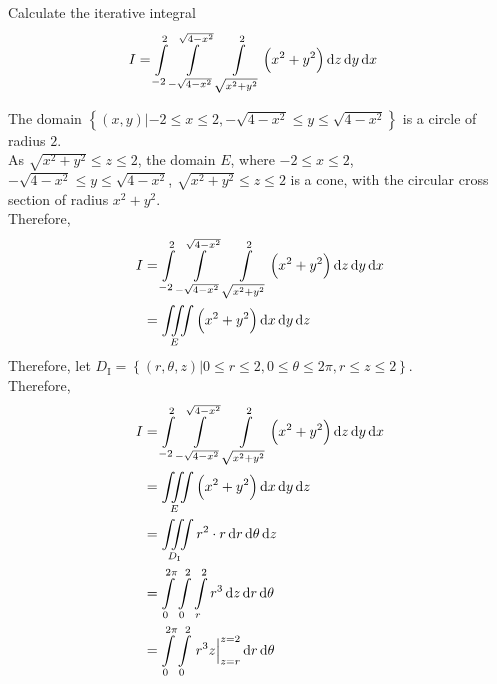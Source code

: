 \documentclass[fleqn, a4paper, 12pt, twoside]{article}
\theoremstyle{definition}
\theoremstyle{theorem}
\begin{document}
{\begin{question}
	Calculate the iterative integral
	\begin{align*}
		I & = \int\limits_{-2}^{2} \int\limits_{-\sqrt{4 - x^2}}^{\sqrt{4 - x^2}} \int\limits_{\sqrt{x^2 + y^2}}^{2} \left( x^2 + y^2 \right) \dif z \dif y \dif x
	\end{align*}
\end{question}

\begin{solution}
	The domain $\left\{ (x,y) | -2 \le x \le 2 , -\sqrt{4 - x^2} \le y \le \sqrt{4 - x^2} \right\}$ is a circle of radius $2$.\\
	As $\sqrt{x^2 + y^2} \le z \le 2$, the domain $E$, where $-2 \le x \le 2$, $-\sqrt{4 - x^2} \le y \le \sqrt{4 - x^2}$, $\sqrt{x^2 + y^2} \le z \le 2$ is a cone, with the circular cross section of radius $x^2 + y^2$.\\
	Therefore,
	\begin{align*}
		I & = \int\limits_{-2}^{2} \int\limits_{-\sqrt{4 - x^2}}^{\sqrt{4 - x^2}} \int\limits_{\sqrt{x^2 + y^2}}^{2} \left( x^2 + y^2 \right) \dif z \dif y \dif x \\
                  & = \iiint\limits_{E} \left( x^2 + y^2 \right) \dif x \dif y \dif z
	\end{align*}
	Therefore, let $D_{\mathrm{I}} = \left\{ (r,\theta,z) | 0 \le r \le 2 , 0 \le \theta \le 2 \pi , r \le z \le 2 \right\}$.\\
	Therefore,
	\begin{align*}
		I & = \int\limits_{-2}^{2} \int\limits_{-\sqrt{4 - x^2}}^{\sqrt{4 - x^2}} \int\limits_{\sqrt{x^2 + y^2}}^{2} \left( x^2 + y^2 \right) \dif z \dif y \dif x \\
                  & = \iiint\limits_{E} \left( x^2 + y^2 \right) \dif x \dif y \dif z                                                                                      \\
                  & = \iiint\limits_{D_{\mathrm{I}}} r^2 \cdot r \dif r \dif \theta \dif z                                                                                 \\
                  & = \int\limits_{0}^{2 \pi} \int\limits_{0}^{2} \int\limits_{r}^{2} r^3 \dif z \dif r \dif \theta                                                        \\
                  & = \int\limits_{0}^{2 \pi} \int\limits_{0}^{2} \left. r^3 z \right|_{z = r}^{z = 2} \dif r \dif \theta                                                  \\

\end{align*}
\end{solution}}
\end{document}
